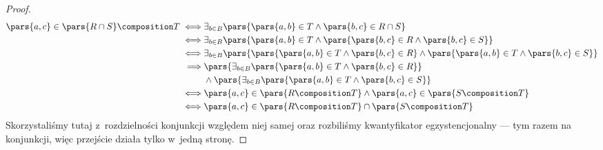\begin{description}
\begin{itemize}
\begin{proof}
                    \begin{equation*}
                        \begin{split}
                            \pars{a, c} \in \pars{R \cap S} \composition T
                                \iff& \exists_{b \in B} \pars{\pars{a, b} \in T \land \pars{b, c} \in R \cap S}\\
                                \iff& \exists_{b \in B} \pars{\pars{a, b} \in T \land \pars{\pars{b, c} \in R \land \pars{b, c} \in S}}\\
                                \iff& \exists_{b \in B} \pars{\pars{\pars{a, b} \in T \land \pars{b, c} \in R} \land \pars{\pars{a, b} \in T \land \pars{b, c} \in S}}\\
                                \implies& \pars{\exists_{b \in B} \pars{\pars{a, b} \in T \land \pars{b, c} \in R}}\\
                                    &\land \pars{\exists_{b \in B}\pars{\pars{a, b} \in T \land \pars{b, c} \in S}}\\
                                \iff& \pars{a, c} \in \pars{R \composition T} \land \pars{a, c} \in \pars{S \composition T}\\
                                \iff& \pars{a, c} \in \pars{R \composition T} \cap \pars{S \composition T}
                        \end{split}
                    \end{equation*}
                    Skorzystaliśmy tutaj z~rozdzielności konjunkcji względem niej samej oraz rozbiliśmy kwantyfikator egzystencjonalny --- tym razem na konjunkcji, więc przejście działa tylko w~jedną stronę.
                \end{proof}
        \end{itemize}
\end{description}
